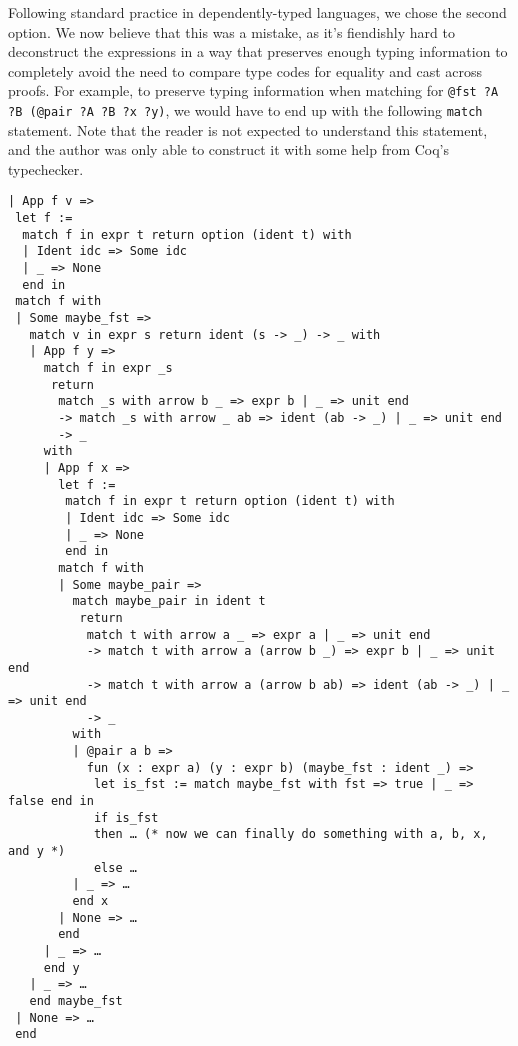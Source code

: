 Following standard practice in dependently-typed languages, we chose the second option.
We now believe that this was a mistake, as it's fiendishly hard to deconstruct the expressions in a way that preserves enough typing information to completely avoid the need to compare type codes for equality and cast across proofs.
For example, to preserve typing information when matching for \texttt{@fst ?A ?B (@pair ?A ?B ?x ?y)}, we would have to end up with the following \texttt{match} statement.
Note that the reader is not expected to understand this statement, and the author was only able to construct it with some help from Coq's typechecker.
\begin{verbatim}
| App f v =>
 let f :=
  match f in expr t return option (ident t) with
  | Ident idc => Some idc
  | _ => None
  end in
 match f with
 | Some maybe_fst =>
   match v in expr s return ident (s -> _) -> _ with
   | App f y =>
     match f in expr _s
      return
       match _s with arrow b _ => expr b | _ => unit end
       -> match _s with arrow _ ab => ident (ab -> _) | _ => unit end
       -> _
     with
     | App f x =>
       let f :=
        match f in expr t return option (ident t) with
        | Ident idc => Some idc
        | _ => None
        end in
       match f with
       | Some maybe_pair =>
         match maybe_pair in ident t
          return
           match t with arrow a _ => expr a | _ => unit end
           -> match t with arrow a (arrow b _) => expr b | _ => unit end
           -> match t with arrow a (arrow b ab) => ident (ab -> _) | _ => unit end
           -> _
         with
         | @pair a b =>
           fun (x : expr a) (y : expr b) (maybe_fst : ident _) =>
            let is_fst := match maybe_fst with fst => true | _ => false end in
            if is_fst
            then … (* now we can finally do something with a, b, x, and y *)
            else …
         | _ => …
         end x
       | None => …
       end
     | _ => …
     end y
   | _ => …
   end maybe_fst
 | None => …
 end
\end{verbatim}
